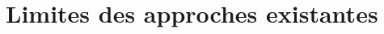 \documentclass[ twoside,openright,titlepage,numbers=noenddot,headinclude,%
                footinclude=true,cleardoublepage=empty,abstractoff, %
                BCOR=5mm,paper=a4,fontsize=11pt,%
                french,american,%
                ]{scrreprt}
\begin{document}
\section{Limites des approches existantes}
\end{document}
